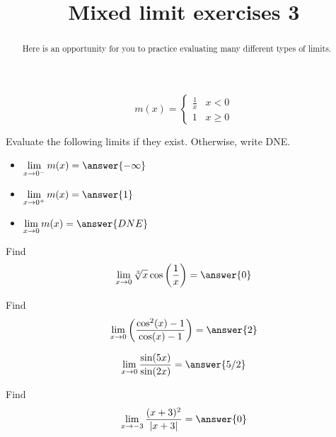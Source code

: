 \documentclass[handout]{ximera}
\title{Mixed limit exercises 3}
\begin{document}
\begin{abstract}
Here is an opportunity for you to practice evaluating many different types of limits. 
\end{abstract}
\maketitle

\begin{exercise}
\[
m(x) = \begin{cases}
  \frac{1}{x}  & x < 0 \\
  1 & x \geq 0
\end{cases}
\]

Evaluate the following limits if they exist.  Otherwise, write DNE. 

\begin{itemize}

\item $\displaystyle\lim_{x \to 0^-} m(x) = \answer{-\infty}$

\item $\displaystyle\lim_{x \to 0^+} m(x) = \answer{1}$

\item $\displaystyle\lim_{x \to 0} m(x) = \answer{DNE}$

\end{itemize}

\end{exercise}

\begin{exercise}
Find
\[ \displaystyle\lim_{x \to 0} \sqrt[3]{x} \cos \left(\frac{1}{x}\right) = \answer{0}\]
\end{exercise}
    
\begin{exercise}
Find
\[
\lim_{x\to0}\left(\frac{\cos^{2}(x)-1}{\cos(x)-1}\right)
= \answer{2}
\]
\end{exercise}

\begin{exercise}
\[\lim_{x \to 0} \frac{\sin(5x)}{\sin(2x)} = \answer{5/2}\]
\end{exercise}

\begin{exercise}
Find 
\[ \displaystyle\lim_{x \to -3} \frac{(x+3)^2}{|x+3|} = \answer{0} \]
\end{exercise}
\end{document}
